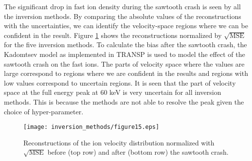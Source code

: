 The significant drop in fast ion density during the sawtooth crash is seen by all the inversion methods. By comparing the absolute values of the reconstructions with the uncertainties, we can identify the velocity-space regions where we can be confident in the result. 
Figure \ref{fig:tomos_sawtooth_normalized_with_MSE} shows the reconstructions normalized by $\sqrt{\mathrm{MSE}}$ for the five inversion methods. To calculate the bias after the sawtooth crash, the Kadomtsev model as implemented in TRANSP is used to model the effect of the sawtooth crash on the fast ions.
The parts of velocity space where the values are large correspond to regions where we are confident in the results and regions with low values correspond to uncertain regions. It is seen that the part of velocity space at the full energy peak at 60 keV is very uncertain for all inversion methods. This is because the methods are not able to resolve the peak given the choice of hyper-parameter. 
\begin{figure}[h!]
    \centering
    \texttt{[image: inversion\_methods/figure15.eps]}
    \caption{Reconstructions of the ion velocity distribution normalized with $\sqrt{\mathrm{MSE}}$ before (top row) and after (bottom row) the sawtooth crash.}
    \label{fig:tomos_sawtooth_normalized_with_MSE}
\end{figure}
 
